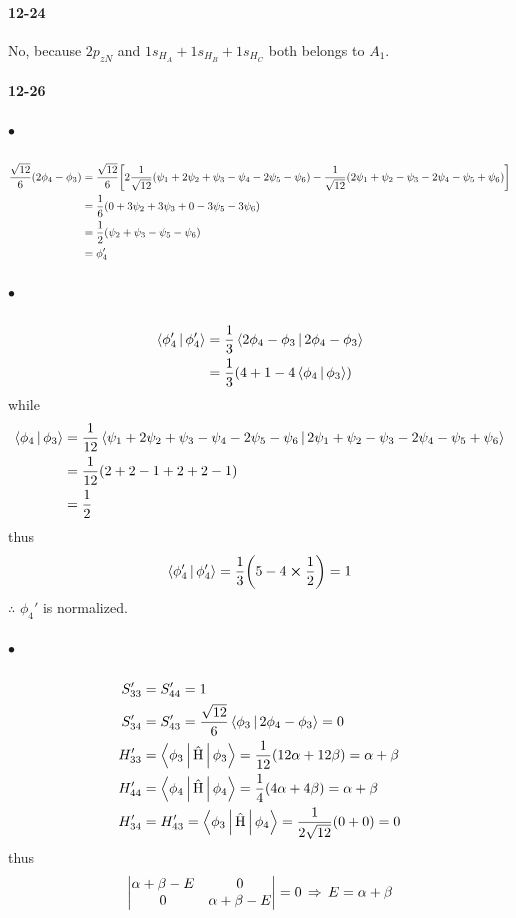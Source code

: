 \documentclass[a4paper]{article}
\DeclareMathOperator{\dra}{\Rightarrow}
\DeclareMathOperator{\hH}{\hat{H}}
\newcommand{\ex}[1]{\paragraph{12-#1}}
\newcommand{\subex}[1]{\subparagraph{#1}}
\numberwithin{equation}{section}
\begin{document}
\ex{24}
No, because $ 2p_{zN} $ and $ 1s_{H_A} + 1s_{H_B} + 1s_{H_C} $ both belongs to $ A_1 $.

\ex{26}
\subex{$ \bullet $}
\begin{align}\label{key}
\dfrac{\sqrt{12}}{6}(2\phi_4 - \phi_3) &= \dfrac{\sqrt{12}}{6}\qty[2\dfrac{1}{\sqrt{12}}\qty(\psi_1 + 2\psi_2 + \psi_3 - \psi_4 - 2\psi_5 - \psi_6) - \dfrac{1}{\sqrt{12}}\qty(2\psi_1 + \psi_2 - \psi_3 - 2\psi_4 - \psi_5 + \psi_6)] \notag\\
&= \dfrac{1}{6}(0 + 3\psi_2 + 3\psi_3 + 0 -3\psi_5 - 3\psi_6)\notag\\
&= \dfrac{1}{2}(\psi_2 + \psi_3 - \psi_5 - \psi_6) \notag\\
&= \phi_4'
\end{align}
\subex{$ \bullet $}
\begin{align}
\Braket{\phi_4' | \phi_4'} &= \dfrac{1}{3}\Braket{2\phi_4 - \phi_3 | 2\phi_4 - \phi_3} \notag\\
&= \dfrac{1}{3}(4 + 1 - 4\Braket{\phi_4|\phi_3})
\end{align}
while
\begin{align}\label{key}
\Braket{\phi_4|\phi_3} &= \dfrac{1}{12}\Braket{\psi_1 + 2\psi_2 + \psi_3 - \psi_4 - 2\psi_5 - \psi_6 | 2\psi_1 + \psi_2 - \psi_3 - 2\psi_4 - \psi_5 + \psi_6} \notag\\
&= \dfrac{1}{12}(2 + 2 - 1 + 2 + 2 - 1) \notag\\
&= \dfrac{1}{2}
\end{align}
thus
\begin{equation}\label{key}
\Braket{\phi_4' | \phi_4'} = \dfrac{1}{3}\qty(5 - 4\cross\dfrac{1}{2}) = 1
\end{equation}
$ \therefore $ $ \phi_4' $ is normalized.
\subex{$ \bullet $}
\begin{align}
S_{33}' &= S_{44}' = 1\\
S_{34}' &= S_{43}' = \dfrac{\sqrt{12}}{6}\Braket{\phi_3 | 2\phi_4 - \phi_3} = 0\\
H_{33}' &= \Braket{\phi_3 | \hH | \phi_3} = \dfrac{1}{12}(12\alpha + 12\beta) = \alpha+\beta\\
H_{44}' &= \Braket{\phi_4 | \hH | \phi_4} = \dfrac{1}{4}(4\alpha + 4\beta) = \alpha+\beta\\
H_{34}' &= H_{43}' = \Braket{\phi_3 | \hH | \phi_4} = \dfrac{1}{2\sqrt{12}}(0 + 0) = 0
\end{align}
thus
\begin{equation}\label{key}
\mqty|\alpha + \beta - E & 0\\ 0 & \alpha + \beta - E| = 0 \;\dra\; E = \alpha+\beta 
\end{equation}
\end{document}
